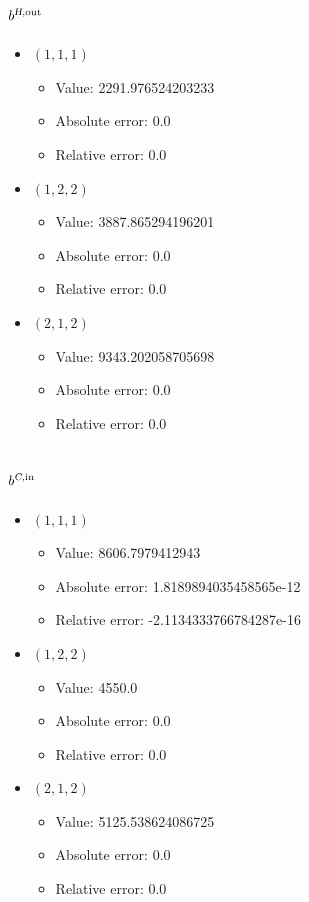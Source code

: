 \documentclass{article}%
\begin{document}
\subsection{$b^{\textsl{H},\text{out}}$}%
\begin{itemize}%
	\item $(1, 1, 1)$%
	\begin{itemize}%
		\item Value: 2291.976524203233%
		\item Absolute error: 0.0%
		\item Relative error: 0.0%
	\end{itemize}%
	\item $(1, 2, 2)$%
	\begin{itemize}%
		\item Value: 3887.865294196201%
		\item Absolute error: 0.0%
		\item Relative error: 0.0%
	\end{itemize}%
	\item $(2, 1, 2)$%
	\begin{itemize}%
		\item Value: 9343.202058705698%
		\item Absolute error: 0.0%
		\item Relative error: 0.0%
	\end{itemize}%
\end{itemize}%
\subsection{$b^{\textsl{C},\text{in}}$}%
\begin{itemize}%
	\item $(1, 1, 1)$%
	\begin{itemize}%
		\item Value: 8606.7979412943%
		\item Absolute error: 1.8189894035458565e-12%
		\item Relative error: -2.1134333766784287e-16%
	\end{itemize}%
	\item $(1, 2, 2)$%
	\begin{itemize}%
		\item Value: 4550.0%
		\item Absolute error: 0.0%
		\item Relative error: 0.0%
	\end{itemize}%
	\item $(2, 1, 2)$%
	\begin{itemize}%
		\item Value: 5125.538624086725%
		\item Absolute error: 0.0%
		\item Relative error: 0.0%
	\end{itemize}%
\end{itemize}%
\end{document}
